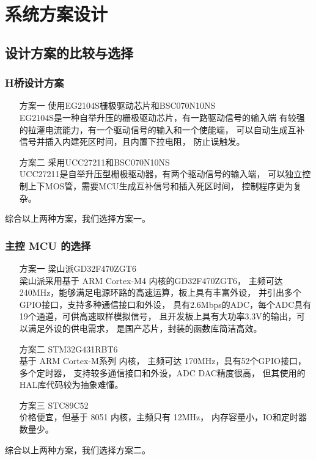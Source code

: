 \documentclass[a4paper,12pt]{article}
\begin{document}
\section{系统方案设计}
\subsection{设计方案的比较与选择}

\subsubsection{H桥设计方案}
\begin{enumerate}
    \item[方案一] 使用EG2104S栅极驱动芯片和BSC070N10NS
    \\ 
    EG2104S是一种自举升压的栅极驱动芯片，有一路驱动信号的输入端
    有较强的拉灌电流能力，有一个驱动信号的输入和一个使能端，
    可以自动生成互补信号并插入内建死区时间，且内置下拉电阻，
    防止误触发。
    \item[方案二] 采用UCC27211和BSC070N10NS
    \\ 
    UCC27211是自举升压型栅极驱动器，有两个驱动信号的输入端，
    可以独立控制上下MOS管，需要MCU生成互补信号和插入死区时间，
    控制程序更为复杂。
\end{enumerate}
综合以上两种方案，我们选择方案一。

\subsubsection{主控 MCU 的选择}
\begin{enumerate}
    \item[方案一] 梁山派GD32F470ZGT6 
    \\
    梁山派采用基于 ARM Cortex-M4 内核的GD32F470ZGT6，
    主频可达240MHz，能够满足电源环路的高速运算，板上具有丰富外设，
    并引出多个GPIO接口，支持多种通信接口和外设，
    具有2.6Mbps的ADC，每个ADC具有19个通道，可供高速取样模拟信号，
    且开发板上具有大功率3.3V的输出，可以满足外设的供电需求，
    是国产芯片，封装的函数库简洁高效。
    \item[方案二] STM32G431RBT6 
    \\ 
    基于 ARM Cortex-M系列 内核，
    主频可达 170MHz，具有52个GPIO接口，多个定时器，
    支持较多通信接口和外设，ADC DAC精度很高，
    但其使用的HAL库代码较为抽象难懂。    
    \item[方案三] STC89C52 
    \\ 
    价格便宜，但基于 8051 内核，主频只有 12MHz，
    内存容量小，IO和定时器数量少。
\end{enumerate}
综合以上两种方案，我们选择方案二。
\end{document}
